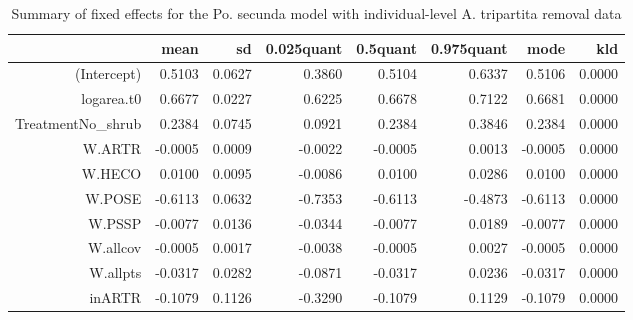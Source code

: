 \begin{table}[ht]
\centering
\caption{Summary of fixed effects for the Po. secunda model with individual-level A. tripartita removal data} 
\label{POSEgrowth-inARTR}
\begin{tabular}{rrrrrrrr}
  \hline
 & mean & sd & 0.025quant & 0.5quant & 0.975quant & mode & kld \\ 
  \hline
(Intercept) & 0.5103 & 0.0627 & 0.3860 & 0.5104 & 0.6337 & 0.5106 & 0.0000 \\ 
  logarea.t0 & 0.6677 & 0.0227 & 0.6225 & 0.6678 & 0.7122 & 0.6681 & 0.0000 \\ 
  TreatmentNo\_shrub & 0.2384 & 0.0745 & 0.0921 & 0.2384 & 0.3846 & 0.2384 & 0.0000 \\ 
  W.ARTR & -0.0005 & 0.0009 & -0.0022 & -0.0005 & 0.0013 & -0.0005 & 0.0000 \\ 
  W.HECO & 0.0100 & 0.0095 & -0.0086 & 0.0100 & 0.0286 & 0.0100 & 0.0000 \\ 
  W.POSE & -0.6113 & 0.0632 & -0.7353 & -0.6113 & -0.4873 & -0.6113 & 0.0000 \\ 
  W.PSSP & -0.0077 & 0.0136 & -0.0344 & -0.0077 & 0.0189 & -0.0077 & 0.0000 \\ 
  W.allcov & -0.0005 & 0.0017 & -0.0038 & -0.0005 & 0.0027 & -0.0005 & 0.0000 \\ 
  W.allpts & -0.0317 & 0.0282 & -0.0871 & -0.0317 & 0.0236 & -0.0317 & 0.0000 \\ 
  inARTR & -0.1079 & 0.1126 & -0.3290 & -0.1079 & 0.1129 & -0.1079 & 0.0000 \\ 
   \hline
\end{tabular}
\end{table}

